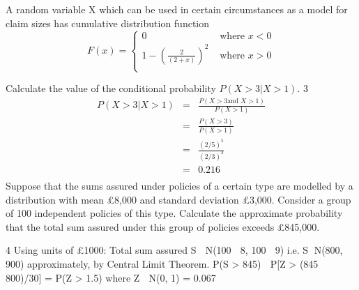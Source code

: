 \documentclass[a4paper,12pt]{article}
\begin{document}
 

A random variable X which can be used in certain circumstances as a model for claim sizes has cumulative distribution function
\[F(x) = \begin{cases}
0 & \mbox{ where }  x < 0 \\ 
1 - \left(\frac{2}{(2+x)}\right)^2 & \mbox{ where }  x > 0 \\ 
\end{cases}
\]

Calculate the value of the conditional probability $P(X > 3|X > 1)$. 
3 
\begin{eqnarray*}
P(X > 3| X > 1) &=& \frac{P(X > 3 \mbox{and }X > 1)}{P(X > 1)}\\
&=& \frac{P(X > 3 )}{P(X > 1)}\\
&=& \frac{(2/5)^5 }{(2/3)^3 }\\
&=& 0.216\\
\end{eqnarray*}
\newpage 
Suppose that the sums assured under policies of a certain type are modelled by a distribution with mean £8,000 and standard deviation £3,000. Consider a group of 100 independent policies of this type.
Calculate the approximate probability that the total sum assured under this group of policies exceeds £845,000.


4 Using units of £1000:
Total sum assured S  N(100  8, 100  9) i.e. S  N(800, 900) approximately, by
Central Limit Theorem.
P(S > 845)  P[Z > (845  800)/30] = P(Z > 1.5) where Z  N(0, 1)
= 0.067
\end{document}
